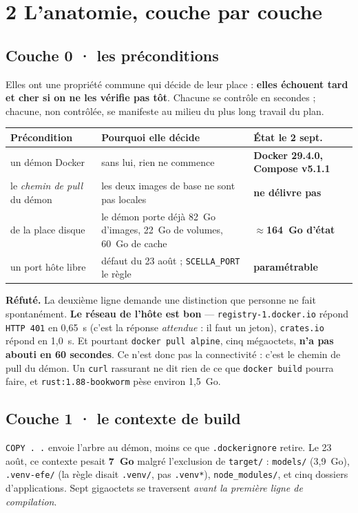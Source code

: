 \documentclass[11pt]{article}
\newcommand{\code}[1]{\texttt{\small #1}}
\newcommand{\best}[1]{{\color{efesolve}\textbf{#1}}}
\newcommand{\pire}[1]{{\color{efered}\textbf{#1}}}
\newcommand{\moyen}[1]{{\color{efeamber}\textbf{#1}}}
\newcommand{\refute}[1]{{\color{efered}\textbf{Réfuté.} }#1\par}
\begin{document}
\section{2 \;\textbar\; L'anatomie, couche par couche}

\subsection{Couche 0 · les préconditions}
Elles ont une propriété commune qui décide de leur place : \textbf{elles échouent tard et cher si on
ne les vérifie pas tôt}. Chacune se contrôle en secondes ; chacune, non contrôlée, se manifeste au
milieu du plus long travail du plan.

\begin{center}\small
\renewcommand{\arraystretch}{1.25}
\begin{tabular}{@{}>{\raggedright\arraybackslash}p{4.0cm} >{\raggedright\arraybackslash}p{7.4cm} >{\raggedright\arraybackslash}p{4.2cm}@{}}
\toprule
\textbf{Précondition} & \textbf{Pourquoi elle décide} & \textbf{État le 2 sept.} \\
\midrule
un démon Docker & sans lui, rien ne commence & \best{Docker 29.4.0, Compose v5.1.1} \\
le \emph{chemin de pull} du démon & les deux images de base ne sont pas locales & \pire{ne délivre pas} \\
de la place disque & le démon porte déjà 82~Go d'images, 22~Go de volumes, 60~Go de cache & \moyen{$\approx$164~Go d'état} \\
un port hôte libre & défaut du 23 août ; \code{SCELLA\_PORT} le règle & \best{paramétrable} \\
\bottomrule
\end{tabular}
\end{center}

\refute{La deuxième ligne demande une distinction que personne ne fait spontanément.
\textbf{Le réseau de l'hôte est bon} --- \code{registry-1.docker.io} répond \code{HTTP 401} en
0,65~s (c'est la réponse \emph{attendue} : il faut un jeton), \code{crates.io} répond en 1,0~s. Et
pourtant \code{docker pull alpine}, cinq mégaoctets, \textbf{n'a pas abouti en 60 secondes}. Ce
n'est donc pas la connectivité : c'est le chemin de pull du démon. Un \code{curl} rassurant ne dit
rien de ce que \code{docker build} pourra faire, et \code{rust:1.88-bookworm} pèse environ 1,5~Go.}

\subsection{Couche 1 · le contexte de build}
\code{COPY . .} envoie l'arbre au démon, moins ce que \code{.dockerignore} retire. Le 23 août, ce
contexte pesait \textbf{7~Go} malgré l'exclusion de \code{target/} : \code{models/} (3,9~Go),
\code{.venv-efe/} (la règle disait \code{.venv/}, pas \code{.venv*}), \code{node\_modules/}, et cinq
dossiers d'applications. Sept gigaoctets se traversent \emph{avant la première ligne de
compilation}.
\end{document}
